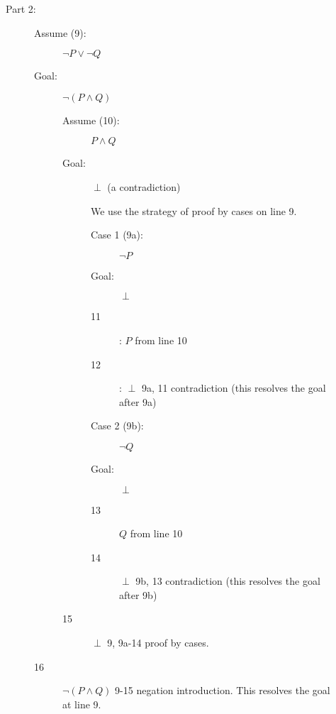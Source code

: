 \documentclass[12pt]{book}
\begin{document}
\begin{description}
\begin{description}
\begin{description}
\end{description}

\newpage


\item[Part 2:]

\begin{description}

\item[Assume (9):]  $\neg P \vee \neg Q$

\item[Goal:]  $\neg(P \wedge Q)$

\begin{description}

\item[Assume (10):]  $P \wedge Q$

\item[Goal:]  $\perp$ (a contradiction)

We use the strategy of proof by cases on line 9.
\begin{description}
\item[Case 1 (9a):]  $\neg P$

\item[Goal:]  $\perp$

\item[11]:  $P$ from line 10

\item[12]: $\perp$ 9a, 11 contradiction (this resolves the goal after 9a)

\item[Case 2 (9b):]  $\neg Q$

\item[Goal:] $\perp$

\item[13]  $Q$ from line 10

\item[14]  $\perp$  9b, 13 contradiction (this resolves the goal after 9b)

\end{description}

\item[15]  $\perp$ 9, 9a-14 proof by cases.

\end{description}

\item[16]  $\neg (P \wedge Q)$  9-15 negation introduction.  This resolves the goal at line 9.




\end{description}




\end{description}
\end{description}
\end{document}
